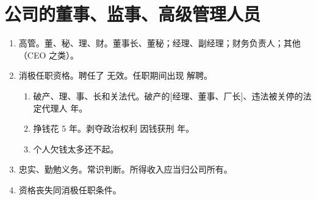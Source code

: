 \section{公司的董事、监事、高级管理人员}
\begin{enumerate}
  \item 高管。董、秘、理、财。董事长、董秘；经理、副经理；财务负责人；其他（CEO 之类）。
  \item 消极任职资格。聘任了 \yjt 无效。任职期间出现 \yjt 解聘。
        \begin{enumerate}
          \item 破产、理、事、长和关法代。破产的[经理、董事、厂长]、违法被关停的法定代理人  年。
          \item 挣钱花 5 年。剥夺政治权利 \hz 因钱获刑  年。
          \item 个人欠钱太多还不起。
        \end{enumerate}
  \item 忠实、勤勉义务。常识判断。所得收入应当归公司所有。
  \item 资格丧失同消极任职条件。
\end{enumerate}
